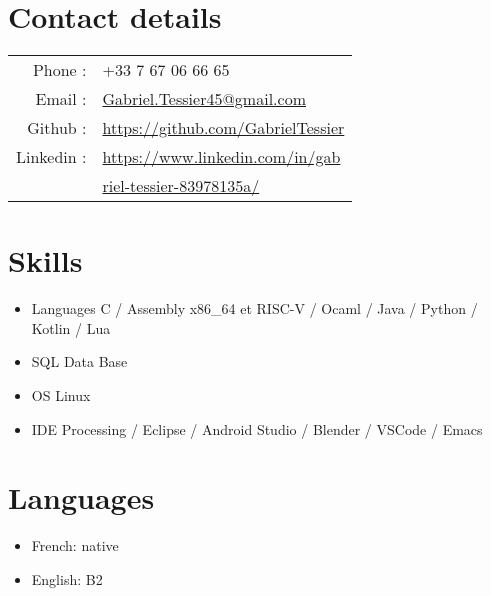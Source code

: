 \documentclass[11pt,oneside,a4paper,titlepage]{article}
\begin{document}
\begin{tcolorbox}
  \begin{minipage}[t]{8cm}
    \vspace*{-0.5cm}
    \begin{tcolorbox}[grow to left by=0.6cm,colback=gray!25,colframe=white]
      \section*{Contact details}
      \setlength{\tabcolsep}{2pt}
      \begin{tabular}{rl}
        Phone : & +33 7 67 06 66 65 \\
        Email : & \href{mailto:Gabriel.Tessier45@gmail.com}{Gabriel.Tessier45@gmail.com} \\
        Github : & \href{https://github.com/GabrielTessier}{https://github.com/GabrielTessier} \\
        Linkedin : & \href{https://www.linkedin.com/in/gabriel-tessier-83978135a/}{https://www.linkedin.com/in/gab}\\
        & \href{https://www.linkedin.com/in/gabriel-tessier-83978135a/}{riel-tessier-83978135a/}
      \end{tabular}

      \section*{Skills}
      \begin{itemize}
        \item{Languages C / Assembly x86\_64 et RISC-V / Ocaml / Java / Python / Kotlin / Lua}
        \item{SQL Data Base}
        \item{OS Linux}
        \item{IDE Processing / Eclipse / Android Studio / Blender / VSCode / Emacs}
      \end{itemize}

      \section*{Languages}
      \begin{itemize}
        \item{French: native}
        \item{English: B2}
      \end{itemize}


\end{tcolorbox}
\end{minipage}
\end{tcolorbox}
\end{document}
